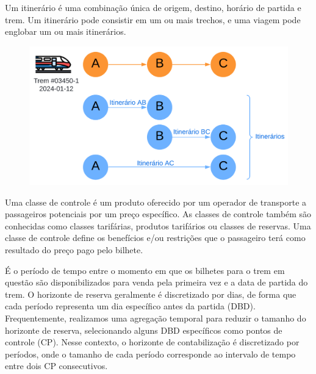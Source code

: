 \begin{description}[style=unboxed, leftmargin=0cm]
    Um itinerário é uma combinação única de origem, destino, horário de partida e trem. Um itinerário pode consistir em um ou mais trechos, e uma viagem pode englobar um ou mais itinerários.

        \begin{figure}[H]
            \begin{center}
                \includegraphics[scale=0.12]{img/itinerario.png}
                \label{fig: itinerario}
            \end{center}
        \end{figure}
        \vspace{-1cm}

	\item[Classes de controle:] Uma classe de controle é um produto oferecido por um operador de transporte a passageiros potenciais por um preço específico. As classes de controle também são conhecidas como classes tarifárias, produtos tarifários ou classes de reservas. Uma classe de controle define os benefícios e/ou restrições que o passageiro terá como resultado do preço pago pelo bilhete.

	\item[Horizonte de reserva:] É o período de tempo entre o momento em que os bilhetes para o trem em questão são disponibilizados para venda pela primeira vez e a data de partida do trem. O horizonte de reserva geralmente é discretizado por dias, de forma que cada período representa um dia específico antes da partida (DBD). Frequentemente, realizamos uma agregação temporal para reduzir o tamanho do horizonte de reserva, selecionando alguns DBD específicos como pontos de controle (CP). Nesse contexto, o horizonte de contabilização é discretizado por períodos, onde o tamanho de cada período corresponde ao intervalo de tempo entre dois CP consecutivos.


\end{description}

